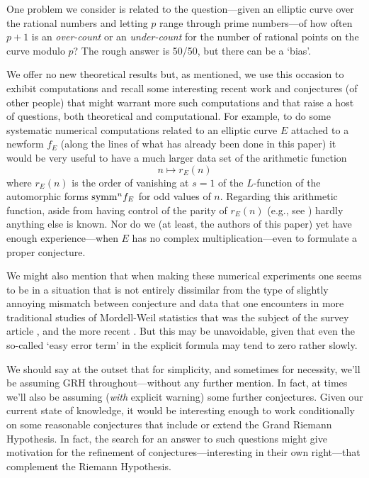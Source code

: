 \documentclass[11pt]{article}
\theoremstyle{plain}
\theoremstyle{definition}
\numberwithin{equation}{section}
\numberwithin{figure}{section}
\numberwithin{table}{section}
\begin{document}
 One problem we consider is related to the question---given an elliptic curve over the rational numbers and letting  $p$ range through prime numbers---of how often  $p+1$ is an {\it over-count} or an {\it under-count} for the number of rational points on the curve modulo $p$? The rough answer is 50/50, but there can be a `bias'.


 We offer no new theoretical results but, as mentioned, we use this occasion to exhibit computations and recall some interesting recent work and conjectures  (of other people)  that might warrant more such computations and that raise a host of questions, both theoretical and computational.   For example, to do some systematic numerical computations related to an elliptic curve $E$ attached to a newform $f_E$  (along the lines of what has already been done in this paper)  it would be very useful to have a much larger data set  of the arithmetic function  $$n \mapsto r_E(n)$$
 where $r_E(n)$ is the order of vanishing at $s=1$ of the $L$-function of the automorphic forms ${\rm symm}^n f_E$ for odd values of $n$.  Regarding this arithmetic function, aside from having control of the parity of   $r_E(n)$  (e.g., see \cite{DMW})  hardly anything else is known. Nor do we (at least, the authors of this paper)  yet have enough
 experience---when $E$ has no complex multiplication---even to formulate a proper conjecture.

 We might also mention that when making these numerical experiments one seems to be in a situation  that is not entirely dissimilar from the type of slightly annoying mismatch between conjecture and data that one encounters in more traditional studies of Mordell-Weil statistics  that was the subject of the survey article \cite{bmsw:bulletins}, and the more recent \cite{ecdb:height}.  But this may be unavoidable, given that even  the so-called  `easy error term' in the explicit formula may tend to zero rather slowly.

 We should say at the outset that for simplicity, and sometimes for necessity, we'll be assuming GRH throughout---without any further mention. In fact, at times we'll also be assuming ({\it with} explicit warning) some further conjectures. Given our current state of knowledge, it would be interesting enough to work  conditionally on some reasonable conjectures that include or extend the Grand Riemann Hypothesis.  In fact, the search for an answer to such questions  might give  motivation for the refinement of conjectures---interesting in their own right---that complement the Riemann Hypothesis.
\end{document}
